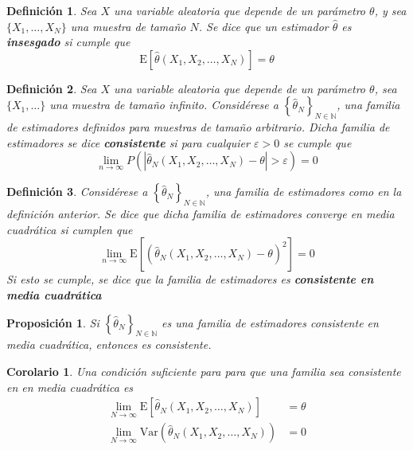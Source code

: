 \documentclass[12pt,letterpaper,draft]{book}
\newtheorem{definicion}{Definición}[chapter]
\newtheorem{proposicion}[teorema]{Proposición}
\newtheorem{corolario}[teorema]{Corolario}
\newcommand{\N}{\mathbb{N}}
\newcommand{\E}[1]{\mathrm{E}\left[ #1 \right]}
\newcommand{\Var}[1]{\mathrm{Var}\left( #1 \right)}
\newcommand{\abso}[1]{\left| #1 \right|}
\begin{document}
\begin{definicion}
Sea $X$ una variable aleatoria que depende de un parámetro $\theta$, y sea $\{ X_1, \dots, X_N \}$ una muestra de tamaño $N$. Se dice que un estimador $\widehat{\theta}$ es \textbf{insesgado} si cumple que
\begin{equation}
\E{\widehat{\theta}(X_1,X_2,\dots,X_N)} = \theta
\end{equation}

\end{definicion}

\begin{definicion}
Sea $X$ una variable aleatoria que depende de un parámetro $\theta$, sea $\{ X_1, \dots\}$ una muestra de tamaño infinito.
%
Considérese a $\left\{ \widehat{\theta}_N \right\}_{N\in \N}$, una familia de estimadores definidos para muestras de tamaño arbitrario. 
%
Dicha familia de estimadores se dice \textbf{consistente} si para cualquier $\varepsilon > 0$ se cumple que
\begin{equation}
\lim_{n\rightarrow\infty} P\left( \abso{\widehat{\theta}_N(X_1,X_2,\dots,X_N)-\theta} > \varepsilon \right) = 0
\end{equation}
\end{definicion}

\begin{definicion}
Considérese a $\left\{ \widehat{\theta}_N \right\}_{N\in \N}$, una familia de estimadores como en la definición anterior.
%
Se dice que dicha familia de estimadores \textit{converge en media cuadrática} si cumplen que
\begin{equation}
\lim_{n\rightarrow\infty} \E{\left( \widehat{\theta}_N(X_1,X_2,\dots,X_N) - \theta \right)^{2}} = 0
\end{equation}
Si esto se cumple, se dice que la familia de estimadores es \textbf{consistente en media cuadrática} \end{definicion}

\begin{proposicion}
Si $\left\{ \widehat{\theta}_N \right\}_{N\in \N}$ es una familia de estimadores consistente en media cuadrática, entonces es consistente.
\end{proposicion}

\begin{corolario}
Una condición suficiente para para que una familia sea consistente en en media cuadrática es
\begin{align}
\lim_{N\rightarrow\infty} \E{\widehat{\theta}_N(X_1,X_2,\dots,X_N)} &= \theta \\
\lim_{N\rightarrow\infty} \Var{\widehat{\theta}_N(X_1,X_2,\dots,X_N)} &= 0
\end{align}
\end{corolario}
\end{document}
